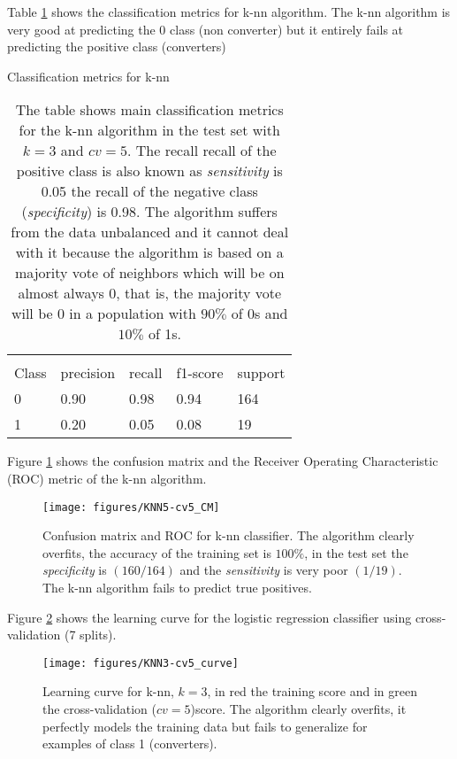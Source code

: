 \documentclass[11pt]{article}
\begin{document}
Table \ref{tab:knn} shows the classification metrics for k-nn algorithm. The k-nn algorithm is very good at predicting the 0 class (non converter) but it entirely fails at predicting the positive class (converters)
\begin{table}[H]
\caption{Classification metrics for k-nn} \label{tab:knn} 
\begin{center} 
\begin{tabular}{lllll}
\hline
\multicolumn{1}{c}{} \\
Class & precision & recall & f1-score & support     \\
\hline
0 & 0.90  &    0.98   &   0.94   &    164 \\
1 & 0.20  &    0.05   &   0.08   &     19 \\
\hline
\end{tabular}
\caption{The table shows  main classification metrics for the k-nn algorithm in the test set with $k=3$ and $cv=5$. The recall recall of the positive class is also known as \emph{sensitivity} is 0.05 the  recall of the negative class (\emph{specificity}) is 0.98. The algorithm suffers from the data unbalanced and it cannot deal with it because the algorithm is based on a majority vote of neighbors which will be on almost always 0, that is, the majority vote will be 0 in a population with $90\%$ of 0s and $10\%$ of 1s.}
\end{center}
\end{table}

Figure \ref{fig:knn-cm} shows the confusion matrix and the Receiver Operating Characteristic (ROC) metric of the k-nn algorithm. 

\begin{figure}[H]
        \centering
        \texttt{[image: figures/KNN5-cv5\_CM]}
        \caption{Confusion matrix and ROC for k-nn classifier. The algorithm clearly overfits, the accuracy of the training set is $100\%$, in the test set the \emph{specificity} is $(160/164)$ and the \emph{sensitivity} is very poor $(1/19)$. The k-nn algorithm fails to predict true positives.
        }
\label{fig:knn-cm}
\end{figure}

Figure \ref{fig:knn-cv3} shows the learning curve for the logistic regression classifier using cross-validation (7 splits).
\begin{figure}[H]
        \centering
        \texttt{[image: figures/KNN3-cv5\_curve]}
        \caption{Learning curve for k-nn, $k=3$, in red the training score and in green the cross-validation ($cv=5$)score. The algorithm clearly overfits, it perfectly models the training data but fails to generalize for examples of class 1 (converters).
        }
\label{fig:knn-cv3}
\end{figure}
\end{document}
